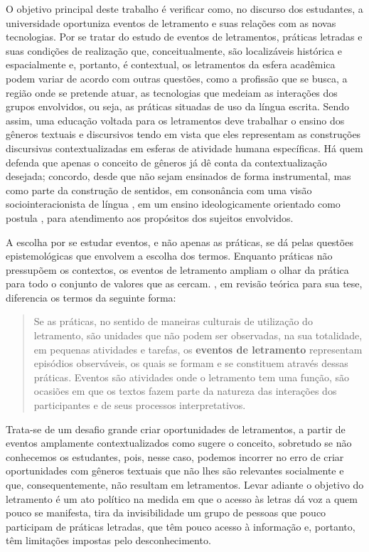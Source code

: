 \documentclass{textolivre}
\begin{document}
O objetivo principal deste trabalho é verificar como, no discurso dos estudantes, a universidade oportuniza eventos de letramento e suas relações com as novas tecnologias. Por se tratar do estudo de eventos de letramentos, práticas letradas e suas condições de realização que, conceitualmente, são localizáveis histórica e espacialmente e, portanto, é contextual, os letramentos da esfera acadêmica podem variar de acordo com outras questões, como a profissão que se busca, a região onde se pretende atuar, as tecnologias que medeiam as interações dos grupos envolvidos, ou seja, as práticas situadas de uso da língua escrita. Sendo assim, uma educação voltada para os letramentos deve trabalhar o ensino dos gêneros textuais e discursivos tendo em vista que eles representam as construções discursivas contextualizadas em esferas de atividade humana específicas. Há quem defenda que apenas o conceito de gêneros já dê conta da contextualização desejada; concordo, desde que não sejam ensinados de forma instrumental, mas como parte da construção de sentidos, em consonância com uma visão sociointeracionista de língua \cite{marcuschi_producao_2008, antunes_aula_2003}, em um ensino ideologicamente orientado como postula \textcite{street_letramentos_2014}, para atendimento aos propósitos dos sujeitos envolvidos.

A escolha por se estudar eventos, e não apenas as práticas, se dá pelas questões epistemológicas que envolvem a escolha dos termos. Enquanto práticas não pressupõem os contextos, os eventos de letramento ampliam o olhar da prática para todo o conjunto de valores que as cercam. \textcite{fischer_construcao_2007}, em revisão teórica para sua tese, diferencia os termos da seguinte forma:

\begin{quote}
    Se as práticas, no sentido de maneiras culturais de utilização do letramento, são unidades que não podem ser observadas, na sua totalidade, em pequenas atividades e tarefas, os \textbf{eventos de letramento} representam episódios observáveis, os quais se formam e se constituem através dessas práticas. Eventos são atividades onde o letramento tem uma função, são ocasiões em que os textos fazem parte da natureza das interações dos participantes e de seus processos interpretativos. \cite[p. 27, grifos da autora]{fischer_construcao_2007}
\end{quote}

Trata-se de um desafio grande criar oportunidades de letramentos, a partir de eventos amplamente contextualizados como sugere o conceito, sobretudo se não conhecemos os estudantes, pois, nesse caso, podemos incorrer no erro de criar oportunidades com gêneros textuais que não lhes são relevantes socialmente e que, consequentemente, não resultam em letramentos. Levar adiante o objetivo do letramento é um ato político na medida em que o acesso às letras dá voz a quem pouco se manifesta, tira da invisibilidade um grupo de pessoas que pouco participam de práticas letradas, que têm pouco acesso à informação e, portanto, têm limitações impostas pelo desconhecimento.
\end{document}
